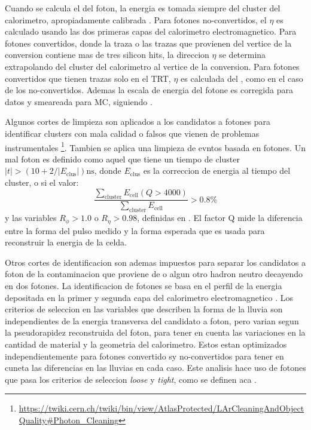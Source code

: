 Cuando se calcula el {\pt} del foton, la energia es tomada siempre del cluster
del calorimetro, apropiadamente calibrada \cite{Banfi:1259219}.
Para fotones no-convertidos, el $\eta$ es calculado usando las dos primeras
capas del calorimetro electromagnetico. Para fotones convertidos, donde la traza
o las trazas que provienen del vertice de la conversion contiene mas de tres
silicon hits, la direccion $\eta$ se determina extrapolando del cluster del
calorimetro al vertice de la conversion.
Para fotones convertidos que tienen trazas solo en el TRT, $\eta$ es calculada
del , como en el caso de los no-convertidos. Ademas
la escala de energia del fotone es corregida para datos y smeareada para MC,
siguiendo \cite{EGScaleTwiki}.

Algunos cortes de limpieza son aplicados a los candidatos a fotones para
identificar clusters con mala calidad o falsos que vienen de problemas
instrumentales \footnote{\url{https://twiki.cern.ch/twiki/bin/view/AtlasProtected/LArCleaningAndObjectQuality\#Photon_Cleaning}}.
Tambien se aplica una limpieza de evntos basada en fotones. Un mal foton
es definido como aquel que tiene un tiempo de cluster $|t|>(10+2/|E_\text{clus}|) \text{ns}$,
donde $E_\text{clus}$ es la correccion de energia al tiempo del cluster,
o si el valor:
\begin{equation}
  \frac{\sum_\text{cluster} E_\text{cell}(Q>4000)}{\sum_\text{cluster} E_\text{cell} } > 0.8\%
\end{equation}
%
y las variables $R_\phi > 1.0$ o $R_\eta > 0.98$, definidas
en \cite{PhotonCleaning}. El factor Q mide la diferencia entre la forma
del pulso medido y la forma esperada que es usada para reconstruir
la energia de la celda.

Otros cortes de identificacion son ademas impuestos para separar los
candidatos a foton de la contaminacion que proviene de {\pizero} o
algun otro hadron neutro decayendo en dos fotones. La identificacion
de fotones se basa en el perfil de la energia depositada en la primer
y segunda capa del calorimetro electromagnetico \cite{ATL-PHYS-PUB-2011-007}.
Los criterios de seleccion en las variables que describen la forma de
la lluvia son independientes de la energia transversa del candidato a
foton, pero varian segun la pseudorapidez reconstruida del foton, para
tener en cuenta las variaciones en la cantidad de material y la geometria
del calorimetro. Estos estan optimizados independientemente para fotones
convertido sy no-convertidos para tener en cuneta las diferencias en las
lluvias en cada caso. Este analisis hace uso de fotones que pasa los
criterios de seleccion \emph{loose} y \emph{tight}, como se definen aca
\cite{ATL-PHYS-PUB-2011-007}.

